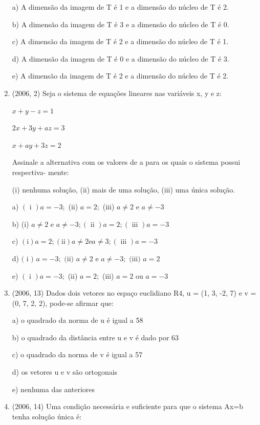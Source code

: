 \documentclass{article}
\begin{document}
\begin{enumerate}
a) A dimensão da imagem de T é 1 e a dimensão do núcleo de T é 2.

b) A dimensão da imagem de T é 3 e a dimensão do núcleo de T é 0.

c) A dimensão da imagem de T é 2 e a dimensão do núcleo de T é 1.

d) A dimensão da imagem de T é 0 e a dimensão do núcleo de T é 3.

e) A dimensão da imagem de T é 2 e a dimensão do núcleo de T é 2.\newline



\item(2006, 2) Seja o sistema de equações lineares nas variáveis x, y e z:

$x+y-z=1$

$2 x+3 y+a z=3$

$x+a y+3 z=2$


Assinale a alternativa com os valores de a para os quais o sistema possui respectiva-
mente:

(i) nenhuma solução, (ii) mais de uma solução, (iii) uma única solução.

a) $(\text { i }) a=-3 ;$ (ii) $a=2 ;$ (iii) $a \neq 2$ e $a \neq-3$

b) (i) $a \neq 2$ e $a \neq-3 ;(\text { ii }) a=2 ;(\text { iii }) a=-3$

c) $(\mathrm{i}) a=2 ;(\mathrm{ii}) a \neq 2 \mathrm{e} a \neq 3 ;(\text { iii }) a=-3$

d) $(\text { i ) } a=-3 ; \text { (ii) } a \neq 2 \text { e } a \neq-3 ; \text { (iii) } a=2$

e) $(\text { i }) a=-3 ;$ (ii) $a=2 ;$ (iii) $a=2$ ou $a=-3$ \newline





\item(2006, 13) Dados dois vetores no espaço euclidiano R4, u = (1, 3, -2, 7) e v = (0, 7, 2, 2),
pode-se afirmar que:

a) o quadrado da norma de u é igual a 58

b) o quadrado da distância entre u e v é dado por 63

c) o quadrado da norma de v é igual a 57

d) os vetores u e v são ortogonais

e) nenhuma das anteriores\newline


\item(2006, 14) Uma condição necessária e suficiente para que o sistema Ax=b tenha solução única é:


\end{enumerate}
\end{document}
